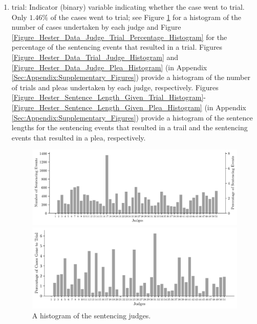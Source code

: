 \documentclass[11pt, oneside]{article}   	%
\theoremstyle{ModifiedStyle}
\begin{document}
\begin{enumerate}
	\item trial: Indicator (binary) variable indicating whether the case went to trial. Only $1.46\%$ of the cases went to trial; see Figure \ref{Figure_Hester_Data_Judge_Histogram} for a histogram of the number of cases undertaken by each judge and Figure \ref{Figure_Hester_Data_Judge_Trial_Percentage_Histogram} for the percentage of the sentencing events that resulted in a trial. Figures \ref{Figure_Hester_Data_Trial_Judge_Histogram} and \ref{Figure_Hester_Data_Judge_Plea_Histogram} (in Appendix \ref{Sec:Appendix:Supplementary_Figures}) provide a histogram of the number of trials and pleas undertaken by each judge, respectively. Figures \ref{Figure_Hester_Sentence_Length_Given_Trial_Histogram}-\ref{Figure_Hester_Sentence_Length_Given_Plea_Histogram} (in Appendix \ref{Sec:Appendix:Supplementary_Figures}) provide a histogram of the sentence lengths for the sentencing events that resulted in a trail and the sentencing events that resulted in a plea, respectively.
	\begin{figure}[H]
		\centering
		\vspace{-2mm}
		\begin{minipage}{\textwidth}
			\vspace{-0mm}
			\centering
			\includegraphics[scale=0.75]{Figures/Judge_Histogram}
			\vspace{-4mm}
			\caption{A histogram of the sentencing judges.}
			\label{Figure_Hester_Data_Judge_Histogram}
		\end{minipage}
		\begin{minipage}{\textwidth}
			\vspace{-0.5mm}
			\centering
			\includegraphics[scale=0.75]{Figures/Judge_Trial_Percentage_Histogram}

\end{minipage}
\end{figure}
\end{enumerate}
\end{document}
